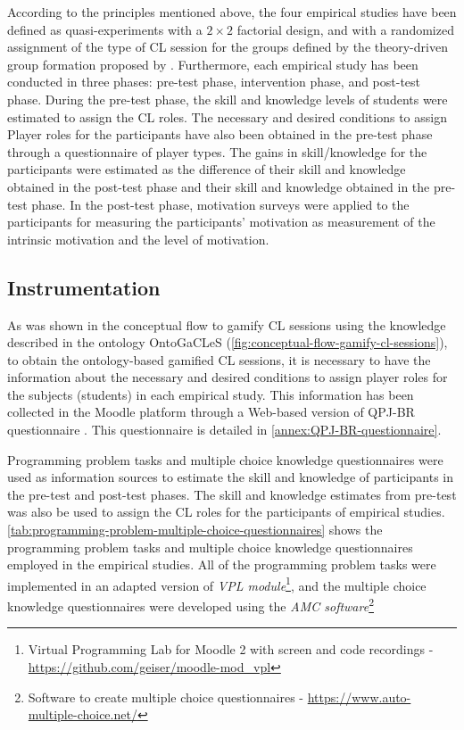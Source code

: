 According to the principles mentioned above, the four empirical studies have been defined as quasi-experiments with a $2\times2$ factorial design, and with a randomized assignment of the type of CL session for the groups defined by the theory-driven group formation proposed by . Furthermore, each empirical study has been conducted in three phases: pre-test phase, intervention phase, and post-test phase. During the pre-test phase, the skill and knowledge levels of students were estimated to assign the CL roles. The necessary and desired conditions to assign Player roles for the participants have also been obtained in the pre-test phase through a questionnaire of player types. The gains in skill/knowledge for the participants were estimated as the difference of their skill and knowledge obtained in the post-test phase and their skill and knowledge obtained in the pre-test phase. In the post-test phase, motivation surveys were applied to the participants for measuring the participants' motivation as measurement of the intrinsic motivation and the level of motivation.

\subsection{Instrumentation}
\label{subsec:instrumentation}

As was shown in the conceptual flow to gamify CL sessions using the knowledge described in the ontology OntoGaCLeS (\autoref{fig:conceptual-flow-gamify-cl-sessions}), to obtain the ontology-based gamified CL sessions, it is necessary to have the information about the necessary and desired conditions to assign player roles for the subjects (students) in each empirical study. This information has been collected in the Moodle platform through a Web-based version of QPJ-BR questionnaire \cite{AndradeMarquesBittencourtIsotani2016}. This questionnaire is detailed in \autoref{annex:QPJ-BR-questionnaire}.

Programming problem tasks and multiple choice knowledge questionnaires were used as information sources to estimate the skill and knowledge of participants in the pre-test and post-test phases. The skill and knowledge estimates from pre-test was also be used to assign the CL roles for the participants of empirical studies.
\autoref{tab:programming-problem-multiple-choice-questionnaires} shows the programming problem tasks and multiple choice knowledge questionnaires employed in the empirical studies.
All of the programming problem tasks were implemented in an adapted version of \emph{VPL module}\footnote{Virtual Programming Lab for Moodle 2 with screen and code recordings - \url{https://github.com/geiser/moodle-mod_vpl}}, and the multiple choice knowledge questionnaires were developed using the \emph{AMC software}\footnote{Software to create multiple choice questionnaires - \url{https://www.auto-multiple-choice.net/}}

